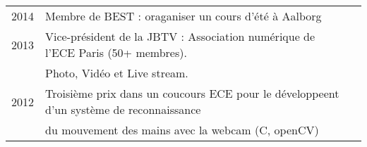 \documentclass[letterpaper]{deedy-resume} %
\begin{document}
\begin{minipage}[t]{0.66\textwidth}
\begin{tabular}{rll}
2014	& Membre de BEST : oraganiser un cours d'été à Aalborg\\
2013	& Vice-président de la JBTV : Association numérique de l'ECE Paris (50+ membres).\\ 
		& Photo, Vidéo et Live stream.\\
2012	& Troisième prix dans un coucours ECE pour le développeent d'un système de reconnaissance \\
		& du mouvement des mains avec la webcam (C, openCV)\\
\end{tabular} 



\sectionspace %


\end{minipage} %








\end{document}
